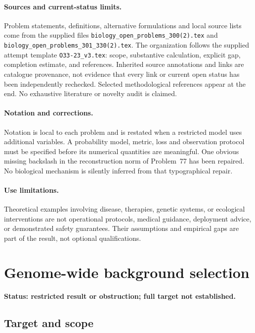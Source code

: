 \documentclass[11pt]{article}
\begin{document}
\paragraph{Sources and current-status limits.}
Problem statements, definitions, alternative formulations and local source lists
come from the supplied files
\texttt{biology\_open\_problems\_300(2).tex} and
\texttt{biology\_open\_problems\_301\_330(2).tex}.
The organization follows the supplied attempt template
\texttt{O33-23\_v3.tex}: scope, substantive calculation, explicit gap,
completion estimate, and references. Inherited source annotations and links are
catalogue provenance, not evidence that every link or current open status has
been independently rechecked. Selected methodological references appear at the
end. No exhaustive literature or novelty audit is claimed.

\paragraph{Notation and corrections.}
Notation is local to each problem and is restated when a restricted model uses
additional variables. A probability model, metric, loss and observation protocol
must be specified before its numerical quantities are meaningful. One obvious
missing backslash in the reconstruction norm of Problem~77 has been repaired.
No biological mechanism is silently inferred from that typographical repair.

\paragraph{Use limitations.}
Theoretical examples involving disease, therapies, genetic systems, or ecological
interventions are not operational protocols, medical guidance, deployment advice,
or demonstrated safety guarantees. Their assumptions and empirical gaps are part
of the result, not optional qualifications.


\section*{Genome-wide background selection}
\label{prob:165}
\noindent\textbf{Status: restricted result or obstruction; full target not established.}
\subsection{Target and scope}
\end{document}
